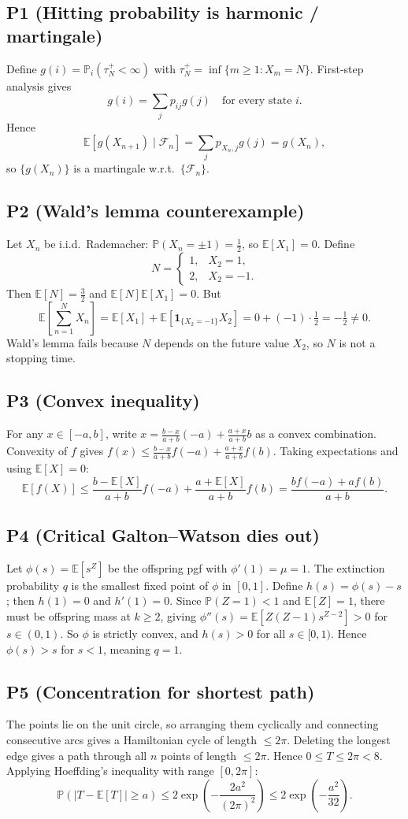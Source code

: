 \documentclass[11pt]{article}
\newcommand{\PP}{\mathbb{P}}
\newcommand{\EE}{\mathbb{E}}
\newcommand{\1}{\mathbf{1}}
\begin{document}
\subsection*{P1 (Hitting probability is harmonic / martingale)}
Define $g(i)=\PP_i(\tau_N^+<\infty)$ with $\tau_N^+=\inf\{m\ge1:X_m=N\}$.  First-step analysis gives
\[
g(i)=\sum_j p_{ij}g(j)\quad\text{for every state }i.
\]
Hence
\[
\EE[g(X_{n+1})\mid\mathcal F_n]=\sum_j p_{X_n,j}g(j)=g(X_n),
\]
so $\{g(X_n)\}$ is a martingale w.r.t.\ $\{\mathcal F_n\}$.

\subsection*{P2 (Wald's lemma counterexample)}
Let $X_n$ be i.i.d.\ Rademacher: $\PP(X_n=\pm1)=\tfrac12$, so $\EE[X_1]=0$.  Define
\[
N=\begin{cases}1,&X_2=1,\\2,&X_2=-1.\end{cases}
\]
Then $\EE[N]=\tfrac32$ and $\EE[N]\EE[X_1]=0$.  But
\[
\EE\!\left[\sum_{n=1}^NX_n\right]=\EE[X_1]+\EE[\1_{\{X_2=-1\}}X_2]=0+(-1)\cdot\tfrac12=-\tfrac12\ne0.
\]
Wald's lemma fails because $N$ depends on the future value $X_2$, so $N$ is not a stopping time.

\subsection*{P3 (Convex inequality)}
For any $x\in[-a,b]$, write $x=\frac{b-x}{a+b}(-a)+\frac{a+x}{a+b}b$ as a convex combination.  Convexity of $f$ gives $f(x)\le\frac{b-x}{a+b}f(-a)+\frac{a+x}{a+b}f(b)$.  Taking expectations and using $\EE[X]=0$:
\[
\EE[f(X)]\le\frac{b-\EE[X]}{a+b}f(-a)+\frac{a+\EE[X]}{a+b}f(b)=\frac{bf(-a)+af(b)}{a+b}.
\]

\subsection*{P4 (Critical Galton--Watson dies out)}
Let $\phi(s)=\EE[s^Z]$ be the offspring pgf with $\phi'(1)=\mu=1$.  The extinction probability $q$ is the smallest fixed point of $\phi$ in $[0,1]$.  Define $h(s)=\phi(s)-s$; then $h(1)=0$ and $h'(1)=0$.  Since $\PP(Z=1)<1$ and $\EE[Z]=1$, there must be offspring mass at $k\ge2$, giving $\phi''(s)=\EE[Z(Z-1)s^{Z-2}]>0$ for $s\in(0,1)$.  So $\phi$ is strictly convex, and $h(s)>0$ for all $s\in[0,1)$.  Hence $\phi(s)>s$ for $s<1$, meaning $q=1$.

\subsection*{P5 (Concentration for shortest path)}
The points lie on the unit circle, so arranging them cyclically and connecting consecutive arcs gives a Hamiltonian cycle of length $\le2\pi$.  Deleting the longest edge gives a path through all $n$ points of length $\le2\pi$.  Hence $0\le T\le2\pi<8$.  Applying Hoeffding's inequality with range $[0,2\pi]$:
\[
\PP(|T-\EE[T]|\ge a)\le2\exp\!\left(-\frac{2a^2}{(2\pi)^2}\right)\le2\exp\!\left(-\frac{a^2}{32}\right).
\]
\end{document}
